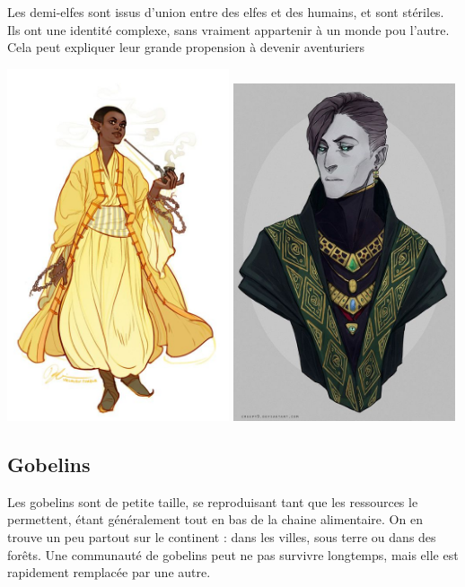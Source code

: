 \documentclass[10pt,a4paper]{book}
\begin{document}
Les demi-elfes sont issus d'union entre des elfes et des humains, et sont stériles. Ils ont une identité complexe, sans vraiment appartenir à un monde pou l'autre. Cela peut expliquer leur grande propension à devenir aventuriers

\includegraphics[width=0.49\textwidth]{elfe 1}
\includegraphics[width=0.49\textwidth]{elfe 2}
\subsection{Gobelins}
Les gobelins sont de petite taille, se reproduisant tant que les ressources le permettent, étant généralement tout en bas de la chaine alimentaire. On en trouve un peu partout sur le continent : dans les villes, sous terre ou dans des forêts. Une communauté de gobelins peut ne pas survivre longtemps, mais elle est rapidement remplacée par une autre.
\end{document}
